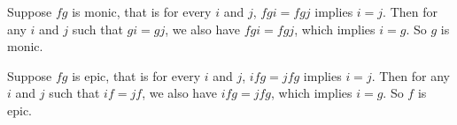 Suppose $fg$ is monic, that is for every $i$ and $j$, $fgi = fgj$ implies $i = j$. Then for any $i$ and $j$ such that $gi = gj$, we also have $fgi = fgj$, which implies $i = g$. So $g$ is monic.

Suppose $fg$ is epic, that is for every $i$ and $j$, $ifg = jfg$ implies $i = j$. Then for any $i$ and $j$ such that $if = jf$, we also have $ifg = jfg$, which implies $i = g$. So $f$ is epic.